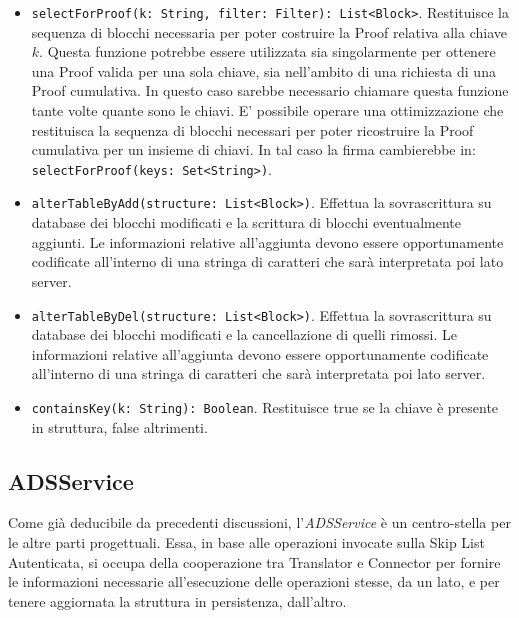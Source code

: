 \begin{itemize}
			\item \verb!selectForProof(k: String, filter: Filter): List<Block>!. Restituisce la sequenza di blocchi necessaria per poter costruire la Proof relativa alla chiave $ k $. Questa funzione potrebbe essere utilizzata sia singolarmente per ottenere una Proof valida per una sola chiave, sia nell'ambito di una richiesta di una Proof cumulativa. In questo caso sarebbe necessario chiamare questa funzione tante volte quante sono le chiavi. E' possibile operare una ottimizzazione che restituisca la sequenza di blocchi necessari per poter ricostruire la Proof cumulativa per un insieme di chiavi. In tal caso la firma cambierebbe in: \verb!selectForProof(keys: Set<String>)!. 
			\item \verb!alterTableByAdd(structure: List<Block>)!. Effettua la sovrascrittura su database dei blocchi modificati e la scrittura di blocchi eventualmente aggiunti. Le informazioni relative all'aggiunta devono essere opportunamente codificate all'interno di una stringa di caratteri che sarà interpretata poi lato server.
			\item \verb!alterTableByDel(structure: List<Block>)!. Effettua la sovrascrittura su database dei blocchi modificati e la cancellazione di quelli rimossi. Le informazioni relative all'aggiunta devono essere opportunamente codificate all'interno di una stringa di caratteri che sarà interpretata poi lato server.
			\item \verb!containsKey(k: String): Boolean!. Restituisce true se la chiave è presente in struttura, false altrimenti.
		\end{itemize}
		
	
	\subsection{ADSService}
	

		Come già deducibile da precedenti discussioni, l'\textit{ADSService} è un centro-stella per le altre parti progettuali. Essa, in base alle operazioni invocate sulla Skip List Autenticata, si occupa della cooperazione tra Translator e Connector per fornire le informazioni necessarie all'esecuzione delle operazioni stesse, da un lato, e per tenere aggiornata la struttura in persistenza, dall'altro.
		
